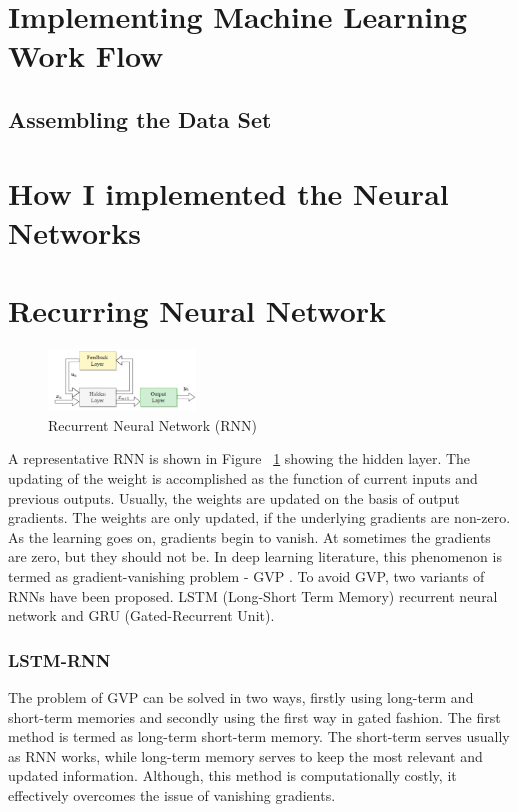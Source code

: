 \section{Implementing Machine Learning Work Flow}





\subsection{Assembling the Data Set}
\section{How I implemented the Neural Networks}
\section{Recurring Neural Network}
\begin{figure}[h!]
	\centering
	\includegraphics[width=0.35\textwidth]{fig/rnn.png}
	\caption{Recurrent Neural Network (RNN)}
	\label{fig:rnn}
\end{figure}
A representative RNN is shown in Figure ~\ref{fig:rnn} showing the hidden layer. The updating of the weight is accomplished as the function of current inputs and previous outputs. Usually, the weights are updated on the basis of output gradients. The weights are only updated, if the underlying gradients are non-zero. As the learning goes on, gradients begin to vanish. At sometimes the gradients are zero, but they should not be. In deep learning literature, this phenomenon is termed as gradient-vanishing problem - GVP \cite{haykin2009neural}. To avoid GVP, two variants of RNNs have been proposed. LSTM (Long-Short Term Memory) recurrent neural network and GRU (Gated-Recurrent Unit).

\subsubsection{LSTM-RNN}

The problem of GVP can be solved in two ways, firstly using long-term and short-term memories and secondly using the first way in gated fashion. The first method is termed as long-term short-term memory. The short-term serves usually as RNN works, while long-term memory serves to keep the most relevant and updated information. Although, this method is computationally costly, it effectively overcomes the issue of vanishing gradients. 

